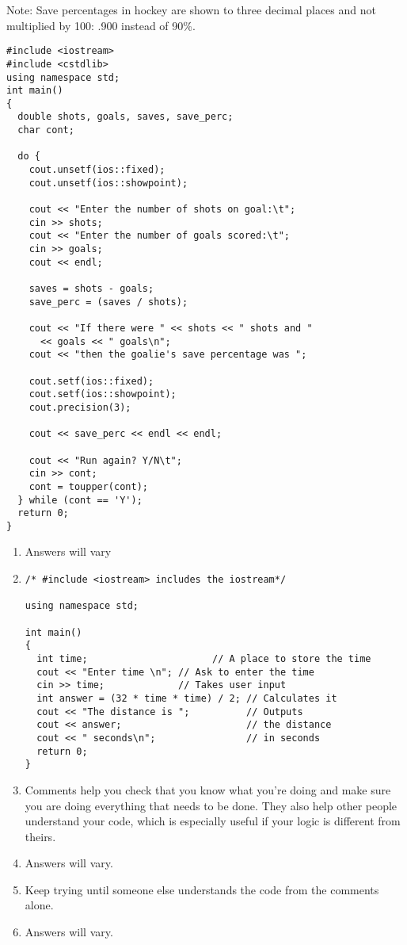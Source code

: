 \begin{enumerate}
Note: Save percentages in hockey are shown to three decimal places and not multiplied by 100: .900 instead of 90\%. \nopagebreak[4]

\noindent\begin{minipage}{\linewidth}\begin{lstlisting}
#include <iostream>
#include <cstdlib>
using namespace std;
int main()
{
  double shots, goals, saves, save_perc;
  char cont;

  do {
    cout.unsetf(ios::fixed);
    cout.unsetf(ios::showpoint);

    cout << "Enter the number of shots on goal:\t";
    cin >> shots;
    cout << "Enter the number of goals scored:\t";
    cin >> goals;
    cout << endl;

    saves = shots - goals;
    save_perc = (saves / shots);

    cout << "If there were " << shots << " shots and " 
      << goals << " goals\n";
    cout << "then the goalie's save percentage was ";

    cout.setf(ios::fixed);
    cout.setf(ios::showpoint);
    cout.precision(3);

    cout << save_perc << endl << endl;

    cout << "Run again? Y/N\t";
    cin >> cont;
    cont = toupper(cont);
  } while (cont == 'Y');
  return 0;
}
\end{lstlisting}\end{minipage}

\end{enumerate}



\begin{enumerate}
	\item Answers will vary
	\item 
\noindent\begin{minipage}{\linewidth}\begin{lstlisting}
/* #include <iostream> includes the iostream*/

using namespace std;

int main()
{
  int time;				         // A place to store the time 
  cout << "Enter time \n"; // Ask to enter the time
  cin >> time;             // Takes user input
  int answer = (32 * time * time) / 2; // Calculates it
  cout << "The distance is ";          // Outputs 
  cout << answer;                      // the distance
  cout << " seconds\n";                // in seconds 
  return 0;
}
\end{lstlisting}\end{minipage}

	\item Comments help you check that you know what you're doing and make sure you are doing everything that needs to be done.
	They also help other people understand your code, which is especially useful if your logic is different from theirs.
	\item Answers will vary.
	\item Keep trying until someone else understands the code from the comments alone.
	\item Answers will vary.

\end{enumerate}

